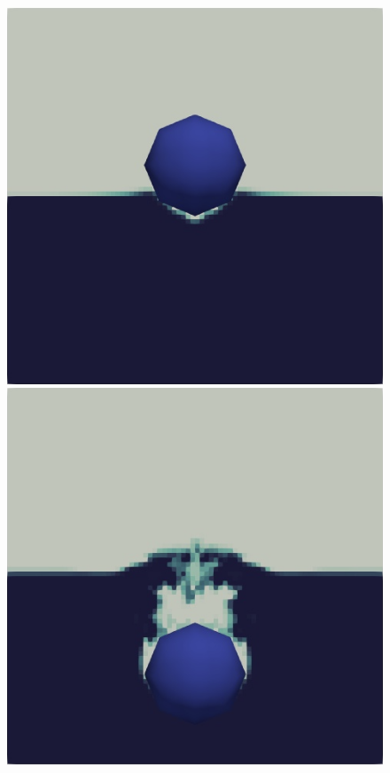 \begin{figure}[H]
\begin{minipage}{.4\textwidth}
        \includegraphics[width=\linewidth]{Images/chap4/water_sphere/sphere_in_water02.png}
    \end{minipage}
    \newline
    \begin{minipage}{.4\textwidth}
        \centering
        \includegraphics[width=\linewidth]{Images/chap4/water_sphere/sphere_in_water04.png}

\end{minipage}
\end{figure}
